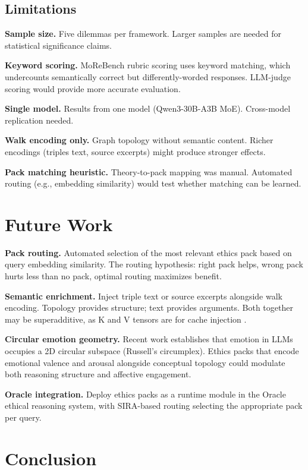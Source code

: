 \documentclass[11pt,a4paper]{article}
\begin{document}
\subsection{Limitations}

\textbf{Sample size.} Five dilemmas per framework. Larger samples are needed for statistical significance claims.

\textbf{Keyword scoring.} MoReBench rubric scoring uses keyword matching, which undercounts semantically correct but differently-worded responses. LLM-judge scoring would provide more accurate evaluation.

\textbf{Single model.} Results from one model (Qwen3-30B-A3B MoE). Cross-model replication needed.

\textbf{Walk encoding only.} Graph topology without semantic content. Richer encodings (triples text, source excerpts) might produce stronger effects.

\textbf{Pack matching heuristic.} Theory-to-pack mapping was manual. Automated routing (e.g., embedding similarity) would test whether matching can be learned.

\section{Future Work}

\textbf{Pack routing.} Automated selection of the most relevant ethics pack based on query embedding similarity. The routing hypothesis: right pack helps, wrong pack hurts less than no pack, optimal routing maximizes benefit.

\textbf{Semantic enrichment.} Inject triple text or source excerpts alongside walk encoding. Topology provides structure; text provides arguments. Both together may be superadditive, as K and V tensors are for cache injection \citep{nexus2026kv}.

\textbf{Circular emotion geometry.} Recent work \citep{sun2026circumplex} establishes that emotion in LLMs occupies a 2D circular subspace (Russell's circumplex). Ethics packs that encode emotional valence and arousal alongside conceptual topology could modulate both reasoning structure and affective engagement.

\textbf{Oracle integration.} Deploy ethics packs as a runtime module in the Oracle ethical reasoning system, with SIRA-based routing selecting the appropriate pack per query.

\section{Conclusion}
\end{document}

